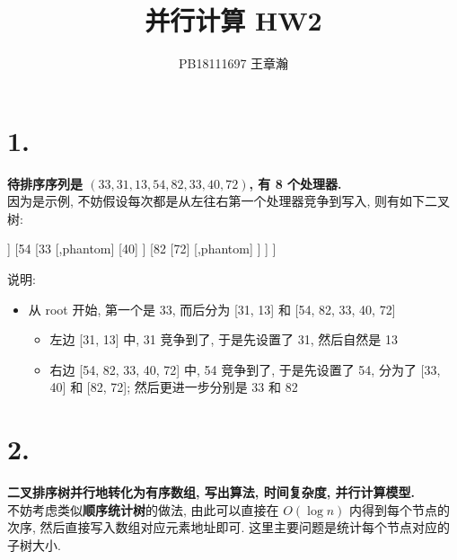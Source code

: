 \documentclass[UTF8]{article}
\title{并行计算 HW2}
\author{PB18111697 王章瀚}
\begin{document}
\maketitle
\section*{1.}
\noindent \textbf{待排序序列是 $(33,31,13,54,82,33,40,72)$, 有 8 个处理器.}\\
因为是示例, 不妨假设每次都是从左往右第一个处理器竞争到写入, 则有如下二叉树: \\
\begin{center}
\begin{forest}
[33
	[31
		[13]
		[,phantom]
	]
	[54
		[33
			[,phantom]
			[40]
		]
		[82
			[72]
			[,phantom]
		]
	]
]
\end{forest}
\end{center}
说明: 
\begin{itemize}
\item 从 root 开始, 第一个是 33, 而后分为 [31, 13] 和 [54, 82, 33, 40, 72]
	\begin{itemize}
	\item 左边 [31, 13] 中, 31 竞争到了, 于是先设置了 31, 然后自然是 13
	\item 右边 [54, 82, 33, 40, 72] 中, 54 竞争到了, 于是先设置了 54, 分为了 [33, 40] 和 [82, 72]; 然后更进一步分别是 33 和 82
	\end{itemize}
\end{itemize}


\newpage
\section*{2.}
\textbf{二叉排序树并行地转化为有序数组, 写出算法, 时间复杂度, 并行计算模型.}\\

不妨考虑类似\textbf{顺序统计树}的做法, 由此可以直接在 $O(\log n)$ 内得到每个节点的次序, 然后直接写入数组对应元素地址即可. 这里主要问题是统计每个节点对应的子树大小.
\end{document}
